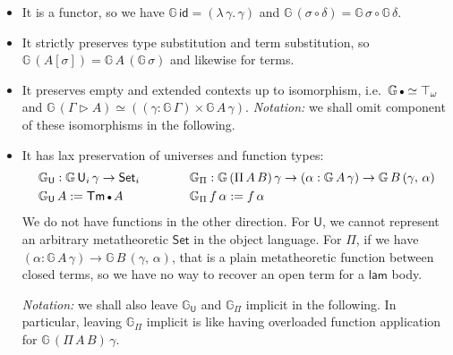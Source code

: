 \documentclass[acmsmall,screen,review,anonymous]{acmart}
\newcommand{\msf}[1]{{\mathsf{#1}}}
\newcommand{\mbb}[1]{\mathbb{#1}}
\newcommand{\U}{\msf{U}}
\newcommand{\Set}{\msf{Set}}
\newcommand{\emptycon}{\scaleobj{.75}\bullet}
\newcommand{\id}{\msf{id}}
\newcommand{\Tm}{\msf{Tm}}
\newcommand{\ext}{\triangleright}
\newcommand{\lam}{\msf{lam}}
\newcommand{\G}{\mbb{G}}
\begin{document}
\begin{itemize}
\item It is a functor, so we have $\G\,\id = (\lambda\,\gamma.\,\gamma)$ and $\G\,(\sigma \circ \delta) = \G\,\sigma \circ \G\,\delta$.
\item It strictly preserves type substitution and term substitution, so $\G\,(A[\sigma]) = \G\,A\,(\G\,\sigma)$ and likewise for terms.
\item It preserves empty and extended contexts up to isomorphism, i.e.\ $\G\,\emptycon \simeq \top_\omega$ and $\G\,(\Gamma \ext A) \simeq ((\gamma : \G\,\Gamma) \times \G\,A\,\gamma)$. \emph{Notation:} we shall omit component of these isomorphisms in the following.
\item It has lax preservation of universes and function types:
\begin{alignat*}{3}
  &\G_\U : \G\,\U_i\,\gamma \to \Set_i\hspace{3em} && \G_\Pi : \G\,(\Pi\,A\,B)\,\gamma \to (\alpha : \G\,A\,\gamma) \to \G\,B\,(\gamma,\,\alpha)\\
  &\G_\U\,A := \Tm\,\emptycon\,A                   && \G_\Pi\,f\,\alpha := f\,\alpha
\end{alignat*}
We do not have functions in the other direction. For $\U$, we cannot represent an arbitrary
metatheoretic $\Set$ in the object language. For $\Pi$, if we have $(\alpha : \G\,A\,\gamma) \to \G\,B\,(\gamma,\,\alpha)$, that is
a plain metatheoretic function between closed terms, so we have no way to recover an open term for a $\lam$ body.

\emph{Notation:} we shall also leave $\G_\U$ and $\G_\Pi$ implicit in the following. In particular, leaving $\G_\Pi$ implicit is like
having overloaded function application for $\G\,(\Pi\,A\,B)\,\gamma$.
\end{itemize}
\end{document}

